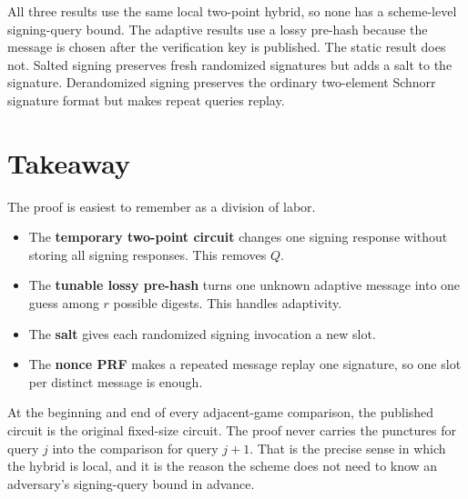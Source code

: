 \documentclass[11pt]{article}
\begin{document}
All three results use the same local two-point hybrid, so none has a
scheme-level signing-query bound.  The adaptive results use a lossy pre-hash
because the message is chosen after the verification key is published.  The
static result does not.  Salted signing preserves fresh randomized signatures
but adds a salt to the signature.  Derandomized signing preserves the
ordinary two-element Schnorr signature format but makes repeat queries
replay.

\section{Takeaway}

The proof is easiest to remember as a division of labor.

\begin{itemize}[leftmargin=2em]
\item The \textbf{temporary two-point circuit} changes one signing response
      without storing all signing responses.  This removes \(Q\).
\item The \textbf{tunable lossy pre-hash} turns one unknown adaptive message
      into one guess among \(r\) possible digests.  This handles adaptivity.
\item The \textbf{salt} gives each randomized signing invocation a new slot.
\item The \textbf{nonce PRF} makes a repeated message replay one signature,
      so one slot per distinct message is enough.
\end{itemize}

At the beginning and end of every adjacent-game comparison, the published
circuit is the original fixed-size circuit.  The proof never carries the
punctures for query \(j\) into the comparison for query \(j+1\).  That is the
precise sense in which the hybrid is local, and it is the reason the scheme
does not need to know an adversary's signing-query bound in advance.
\end{document}
